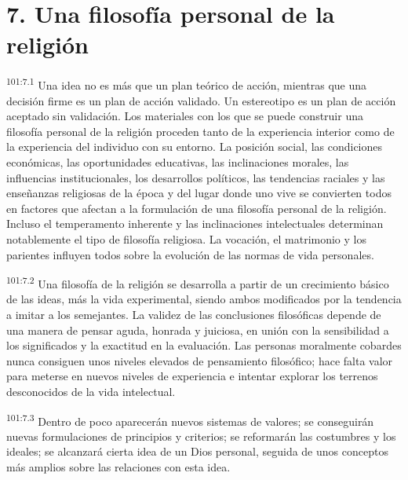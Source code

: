 \section*{7. Una filosofía personal de la religión}
\par
\textsuperscript{101:7.1} Una idea no es más que un plan teórico de acción, mientras que una decisión firme es un plan de acción validado. Un estereotipo es un plan de acción aceptado sin validación. Los materiales con los que se puede construir una filosofía personal de la religión proceden tanto de la experiencia interior como de la experiencia del individuo con su entorno. La posición social, las condiciones económicas, las oportunidades educativas, las inclinaciones morales, las influencias institucionales, los desarrollos políticos, las tendencias raciales y las enseñanzas religiosas de la época y del lugar donde uno vive se convierten todos en factores que afectan a la formulación de una filosofía personal de la religión. Incluso el temperamento inherente y las inclinaciones intelectuales determinan notablemente el tipo de filosofía religiosa. La vocación, el matrimonio y los parientes influyen todos sobre la evolución de las normas de vida personales.

\par
\textsuperscript{101:7.2} Una filosofía de la religión se desarrolla a partir de un crecimiento básico de las ideas, más la vida experimental, siendo ambos modificados por la tendencia a imitar a los semejantes. La validez de las conclusiones filosóficas depende de una manera de pensar aguda, honrada y juiciosa, en unión con la sensibilidad a los significados y la exactitud en la evaluación. Las personas moralmente cobardes nunca consiguen unos niveles elevados de pensamiento filosófico; hace falta valor para meterse en nuevos niveles de experiencia e intentar explorar los terrenos desconocidos de la vida intelectual.

\par
\textsuperscript{101:7.3} Dentro de poco aparecerán nuevos sistemas de valores; se conseguirán nuevas formulaciones de principios y criterios; se reformarán las costumbres y los ideales; se alcanzará cierta idea de un Dios personal, seguida de unos conceptos más amplios sobre las relaciones con esta idea.


